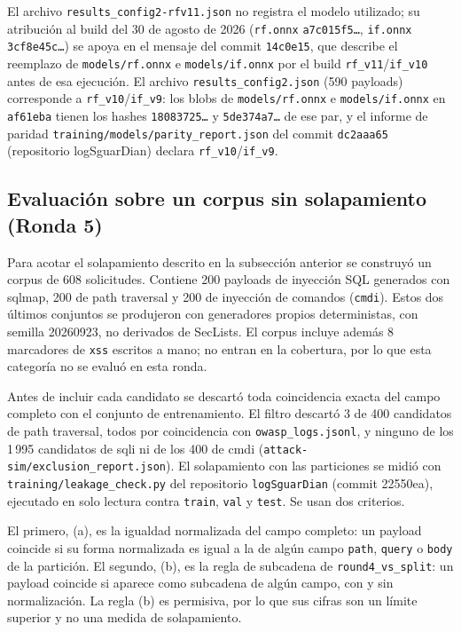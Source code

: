 El archivo \texttt{results\_config2-rfv11.json} no registra el modelo utilizado; su atribución al build del 30 de agosto de 2026 (\texttt{rf.onnx} \texttt{a7c015f5\ldots}, \texttt{if.onnx} \texttt{3cf8e45c\ldots}) se apoya en el mensaje del commit \texttt{14c0e15}, que describe el reemplazo de \texttt{models/rf.onnx} e \texttt{models/if.onnx} por el build \texttt{rf\_v11}/\texttt{if\_v10} antes de esa ejecución.  El archivo \texttt{results\_config2.json} (590 payloads) corresponde a \texttt{rf\_v10}/\texttt{if\_v9}: los blobs de \texttt{models/rf.onnx} e \texttt{models/if.onnx} en \texttt{af61eba} tienen los hashes \texttt{18083725\ldots} y \texttt{5de374a7\ldots} de ese par, y el informe de paridad \texttt{training/models/parity\_report.json} del commit \texttt{dc2aaa65} (repositorio logSguarDian) declara \texttt{rf\_v10}/\texttt{if\_v9}.

\subsection{Evaluación sobre un corpus sin solapamiento (Ronda 5)}\label{sec:ronda5}

Para acotar el solapamiento descrito en la subsección anterior se construyó un corpus de 608 solicitudes. Contiene 200 payloads de inyección SQL generados con sqlmap, 200 de path traversal y 200 de inyección de comandos (\texttt{cmdi}). Estos dos últimos conjuntos se produjeron con generadores propios deterministas, con semilla 20260923, no derivados de SecLists. El corpus incluye además 8 marcadores de \texttt{xss} escritos a mano; no entran en la cobertura, por lo que esta categoría no se evaluó en esta ronda.

Antes de incluir cada candidato se descartó toda coincidencia exacta del campo completo con el conjunto de entrenamiento. El filtro descartó 3 de 400 candidatos de path traversal, todos por coincidencia con \texttt{owasp\_logs.jsonl}, y ninguno de los 1\,995 candidatos de sqli ni de los 400 de cmdi (\texttt{attack-sim/exclusion\_report.json}). El solapamiento con las particiones se midió con \texttt{training/leakage\_check.py} del repositorio \texttt{logSguarDian} (commit 22550ea), ejecutado en solo lectura contra \texttt{train}, \texttt{val} y \texttt{test}. Se usan dos criterios.

El primero, (a), es la igualdad normalizada del campo completo: un payload coincide si su forma normalizada es igual a la de algún campo \texttt{path}, \texttt{query} o \texttt{body} de la partición. El segundo, (b), es la regla de subcadena de \texttt{round4\_vs\_split}: un payload coincide si aparece como subcadena de algún campo, con y sin normalización. La regla (b) es permisiva, por lo que sus cifras son un límite superior y no una medida de solapamiento.

